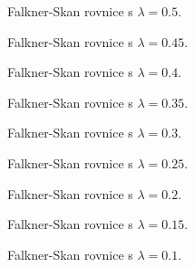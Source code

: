 
\begin{figure}[h]
	\centering
	\def\svgwidth{\textwidth}
	
	\caption{Falkner-Skan rovnice s $\lambda = 0.5$.}
\end{figure}

\begin{figure}[h]
	\centering
	\def\svgwidth{\textwidth}
	
	\caption{Falkner-Skan rovnice s $\lambda = 0.45$.}
\end{figure}

\begin{figure}[h]
	\centering
	\def\svgwidth{\textwidth}
	
	\caption{Falkner-Skan rovnice s $\lambda = 0.4$.}
\end{figure}

\begin{figure}[h]
	\centering
	\def\svgwidth{\textwidth}
	
	\caption{Falkner-Skan rovnice s $\lambda = 0.35$.}
\end{figure}

\begin{figure}[h]
	\centering
	\def\svgwidth{\textwidth}
	
	\caption{Falkner-Skan rovnice s $\lambda = 0.3$.}
\end{figure}

\begin{figure}[h]
	\centering
	\def\svgwidth{\textwidth}
	
	\caption{Falkner-Skan rovnice s $\lambda = 0.25$.}
\end{figure}

\begin{figure}[h]
	\centering
	\def\svgwidth{\textwidth}
	
	\caption{Falkner-Skan rovnice s $\lambda = 0.2$.}
\end{figure}

\begin{figure}[h]
	\centering
	\def\svgwidth{\textwidth}
	
	\caption{Falkner-Skan rovnice s $\lambda = 0.15$.}
\end{figure}

\begin{figure}[h]
	\centering
	\def\svgwidth{\textwidth}
	
	\caption{Falkner-Skan rovnice s $\lambda = 0.1$.}
\end{figure}

